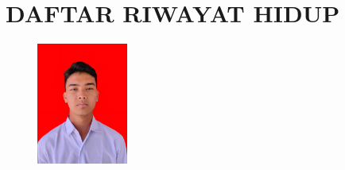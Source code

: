 %
%
%
%

\chapter*{DAFTAR RIWAYAT HIDUP}
\pagestyle{empty}

\noindent
\begin{figure}\vspace{-15pt}
	\includegraphics[width=3cm, height=4cm]{konten/gambar/fotoprofil.jpg}\vspace{-15pt}
\end{figure}
